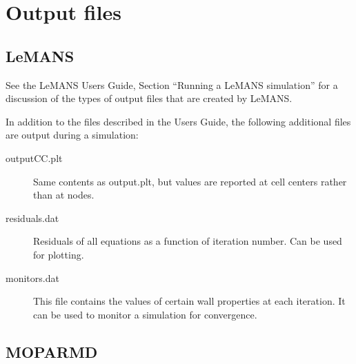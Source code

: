 \documentclass[]{article}
\begin{document}
\section{Output files}

\subsection{LeMANS}
See the LeMANS Users Guide, Section ``Running a LeMANS simulation'' for a discussion of the types of output files that are created by LeMANS.

In addition to the files described in the Users Guide, the following additional files are output during a simulation:

\begin{description}
 \item [outputCC.plt] Same contents as output.plt, but values are reported at cell centers rather than at nodes. 
 \item [residuals.dat] Residuals of all equations as a function of iteration number. Can be used for plotting.
 \item[monitors.dat] This file contains the values of certain wall properties at each iteration.  It can be used to monitor a simulation for convergence.
\end{description}

\subsection{MOPARMD}
\end{document}
